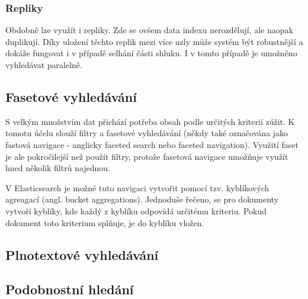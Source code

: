 \subsubsection*{Repliky}
Obdobně lze využít i repliky. Zde se ovšem data indexu nerozdělují, ale naopak duplikují. Díky uložení těchto replik mezi více uzly může systém být robustnější a dokáže fungovat i v případě selhání části shluku. I v tomto případě je umožněno vyhledávat paralelně. 

\subsection{Fasetové vyhledávání}
S velkým množstvím dat přichází potřeba obsah podle určitých kriterií zúžit. K tomotu účelu slouží filtry a fasetové vyhledávání (někdy také označována jako fastová navigace - anglicky faceted search nebo faceted navigation). Využití faset je ale pokročilejší než použít filtry, protože fasetová navigace umožňuje využít hned několik filtrů najednou. %

V Elasticsearch je možné tuto navigaci vytvořit pomocí tzv. kyblíkových agreagací (angl. bucket aggregations).
Jednoduše řečeno, se pro dokumenty vytvoří kyblíky, kde každý z kyblíku odpovídá určitému kriteriu. Pokud dokument toto kriterium splňuje, je do kyblíku vložen.

\subsection{Plnotextové vyhledávání}
\blindtext[2]

\subsection{Podobnostní hledání}
\blindtext[2]